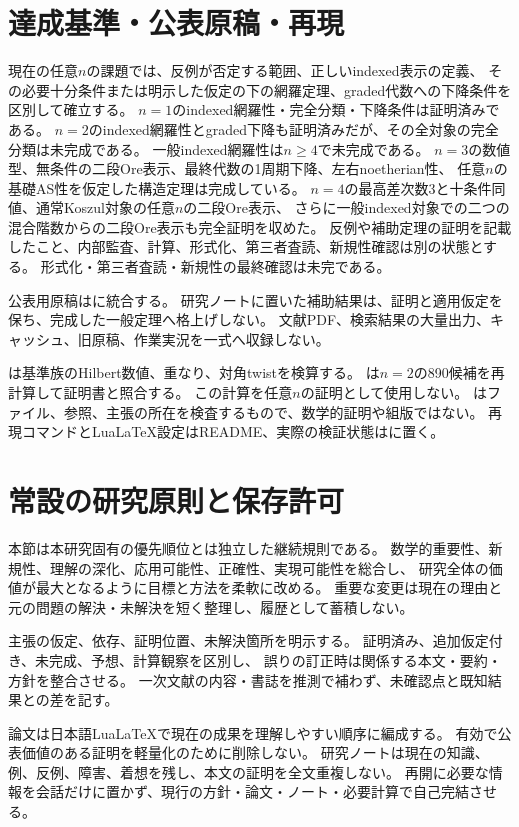 \documentclass[11pt,a4paper]{ltjsarticle}
\begin{document}
\section{達成基準・公表原稿・再現}
現在の任意$n$の課題では、反例が否定する範囲、正しいindexed表示の定義、
その必要十分条件または明示した仮定の下の網羅定理、graded代数への下降条件を区別して確立する。
$n=1$のindexed網羅性・完全分類・下降条件は証明済みである。
$n=2$のindexed網羅性とgraded下降も証明済みだが、その全対象の完全分類は未完成である。
一般indexed網羅性は$n\geq4$で未完成である。
$n=3$の数値型、無条件の二段Ore表示、最終代数の1周期下降、左右noetherian性、
任意$n$の基礎AS性を仮定した構造定理は完成している。
$n=4$の最高差次数3と十条件同値、通常Koszul対象の任意$n$の二段Ore表示、
さらに一般indexed対象での二つの混合階数からの二段Ore表示も完全証明を収めた。
反例や補助定理の証明を記載したこと、内部監査、計算、形式化、第三者査読、新規性確認は別の状態とする。
形式化・第三者査読・新規性の最終確認は未完である。

公表用原稿はに統合する。
研究ノートに置いた補助結果は、証明と適用仮定を保ち、完成した一般定理へ格上げしない。
文献PDF、検索結果の大量出力、キャッシュ、旧原稿、作業実況を一式へ収録しない。

は基準族のHilbert数値、重なり、対角twistを検算する。
は$n=2$の890候補を再計算して証明書と照合する。
この計算を任意$n$の証明として使用しない。
はファイル、参照、主張の所在を検査するもので、数学的証明や組版ではない。
再現コマンドとLuaLaTeX設定はREADME、実際の検証状態はに置く。

\section{常設の研究原則と保存許可}
本節は本研究固有の優先順位とは独立した継続規則である。
数学的重要性、新規性、理解の深化、応用可能性、正確性、実現可能性を総合し、
研究全体の価値が最大となるように目標と方法を柔軟に改める。
重要な変更は現在の理由と元の問題の解決・未解決を短く整理し、履歴として蓄積しない。

主張の仮定、依存、証明位置、未解決箇所を明示する。
証明済み、追加仮定付き、未完成、予想、計算観察を区別し、
誤りの訂正時は関係する本文・要約・方針を整合させる。
一次文献の内容・書誌を推測で補わず、未確認点と既知結果との差を記す。

論文は日本語LuaLaTeXで現在の成果を理解しやすい順序に編成する。
有効で公表価値のある証明を軽量化のために削除しない。
研究ノートは現在の知識、例、反例、障害、着想を残し、本文の証明を全文重複しない。
再開に必要な情報を会話だけに置かず、現行の方針・論文・ノート・必要計算で自己完結させる。
\end{document}
